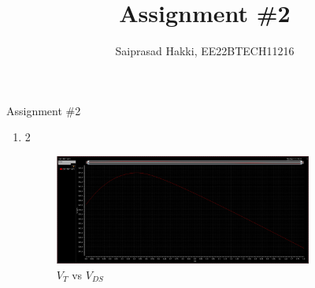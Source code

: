 \documentclass[journal, onecolumn]{IEEEtran} %
\begin{document}
\title{Assignment \#2}
\author{Saiprasad Hakki, \normalsize{EE22BTECH11216}}%
\maketitle
{}%
{Assignment \#2}

\begin{enumerate}[2.]
	\item2 {
		\begin{figure}[H]
			\centering
			\includegraphics[width=0.8\textwidth]{VtVd}
			\caption{$V_{T}$ vs $V_{DS}$}
			\label{fig:VtVd}
		\end{figure}
	}

\end{enumerate}
\end{document}
